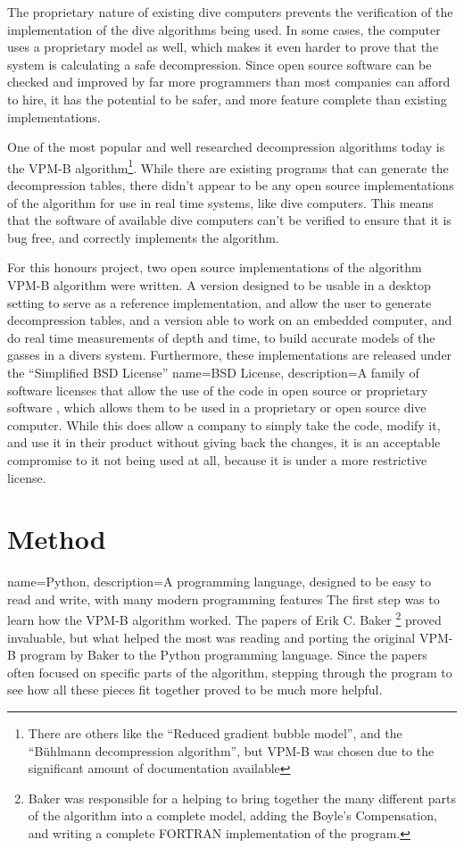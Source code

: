 \documentclass[12pt]{article}
\begin{document}
The proprietary nature of existing dive computers prevents the verification of the implementation of
the dive algorithms being used. In some cases, the computer uses a proprietary model as well, which
makes it even harder to prove that the system is calculating a safe decompression. Since open source
software can be checked and improved by far more programmers than most companies can afford to hire,
it has the potential to be safer, and more feature complete than existing implementations.

One of the most popular and well researched decompression algorithms today is the VPM-B algorithm\footnote{There are others like the ``Reduced gradient bubble model'', and the ``B\"uhlmann decompression algorithm'', but VPM-B was chosen due to the significant amount of documentation available}. While there are existing programs that can generate the
decompression tables, there didn't appear to be any open source implementations of the algorithm for use in real
time systems, like dive computers. This means that the software of available dive computers can't be verified to
ensure that it is bug free, and correctly implements the algorithm.

For this honours project, two open source implementations of the algorithm VPM-B algorithm were written. A version designed to be
usable in a desktop setting to serve as a reference implementation, and allow the user to generate decompression
tables, and a version able to work on an embedded computer, and do real time measurements of depth and time, to
build accurate models of the gasses in a divers system. Furthermore, these implementations are released under the
``Simplified BSD License''  {name={BSD License}, description={A family of software licenses that allow the use of the code in open source or proprietary software}}
, which allows them to be used in a proprietary or open source dive computer. While
this does allow a company to simply take the code, modify it, and use it in their product without
giving back the changes, it is an acceptable compromise to it not being used at all, because it is under
a more restrictive license.

\section{Method}


 { name={Python}, description={A programming language, designed to be easy to read and write, with many
 modern programming features}}
 The first step was to learn how the VPM-B algorithm worked. The papers of Erik C. Baker \footnote{Baker was responsible for a helping to bring together the many different
parts of the algorithm into a complete model, adding the Boyle's Compensation, and writing a complete FORTRAN implementation of the program.} proved invaluable, but what helped the most was reading and porting the original VPM-B
program by Baker to the \gls{Python}
programming language. Since the papers often focused on specific parts of the
algorithm, stepping through the program to see how all these pieces fit together proved to be much more helpful.
\end{document}
